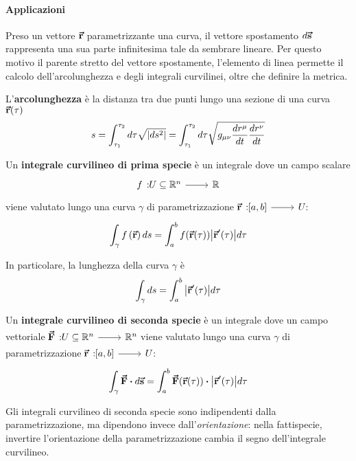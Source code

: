 \paragraph{Applicazioni}
Preso un vettore $\vb*{\va{r}}$ parametrizzante una curva, il vettore spostamento $d\vb*{\va{s}}$ rappresenta una sua parte infinitesima tale da sembrare lineare. Per questo motivo il parente stretto del vettore spostamente, l'elemento di linea permette il calcolo dell'arcolunghezza e degli integrali curvilinei, oltre che definire la metrica.
\begin{define}[Arcolunghezza]
	L'\textbf{arcolunghezza} è la distanza tra due punti lungo una sezione di una curva $\vb*{\va{r}}(\tau)$
	\begin{equation}
		s=\int_{\tau_1}^{\tau_2}d\tau\sqrt{\abs{ds^2}}=\int_{\tau_1}^{\tau_2}d\tau\sqrt{g_{\mu\nu}\frac{dr^{\mu}}{dt}\frac{dr^{\nu}}{dt}}
	\end{equation}
\end{define}
\begin{define}
Un \textbf{integrale curvilineo di prima specie} è un integrale dove un campo scalare
\begin{equation*}
	\funz[f]{U\subseteq\realset^n}{\realset}
\end{equation*}
viene valutato lungo una curva $\gamma$ di parametrizzazione $\funz[\vba{r}]{\left[a,b\right]}{U}$:
\begin{equation}
	\int_\gamma f\left(\vb*{\va{r}}\right)ds=\int_a^b f(\vb*{\va{r}}(\tau))\abs{\vb*{\va{r}}'(\tau)}d\tau
\end{equation}
\end{define}
In particolare, la lunghezza della curva $\gamma$ è
\begin{equation}
	\int_\gamma ds=\int_a^b \abs{\vb*{\va{r}}'(\tau)}d\tau
\end{equation}
\begin{define}
	Un \textbf{integrale curvilineo di seconda specie} è un integrale dove un campo vettoriale $\funz[\vba{F}]{U\subseteq\realset^n}{\realset^n}$ viene valutato lungo una curva $\gamma$ di parametrizzazione $\funz[\vba{r}]{\left[a,b\right]}{U}$:
	\begin{equation}
		\int_\gamma \vba{F}\vdot d\vba{s}=\int_a^b \vba{F}(\vba{r}(\tau))\vdot\abs{\vba{r}'(\tau)}d\tau
	\end{equation}
\end{define}
Gli integrali curvilineo di seconda specie sono indipendenti dalla parametrizzazione, ma dipendono invece dall'\textit{orientazione}: nella fattispecie, invertire l'orientazione della parametrizzazione cambia il segno dell'integrale curvilineo. %
